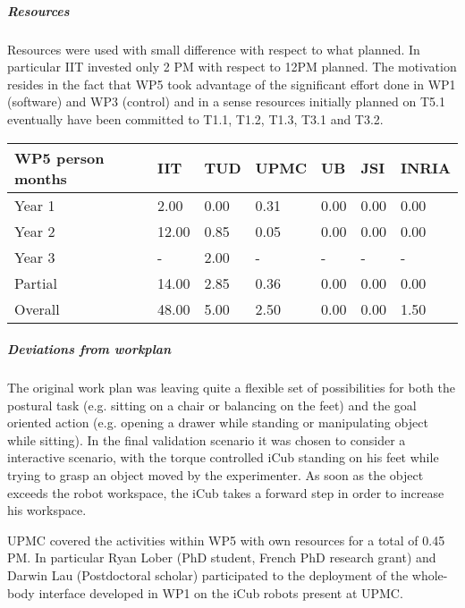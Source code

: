 
\subparagraph{Resources}

Resources were used with small difference with respect to what planned. In particular IIT invested only 2 PM with respect to 12PM planned. The motivation resides in the fact that WP5 took advantage of the significant effort done in WP1 (software) and WP3 (control) and in a sense resources initially planned on T5.1 eventually have been committed to T1.1, T1.2, T1.3, T3.1 and T3.2.

\begin{center}
\begin{tabular}{|C{1.5cm}|C{1.5cm}|C{1.5cm}|C{2cm}|C{2cm}|C{2cm}|C{2cm}|}
\hline
\footnotesize \textbf{WP5 person months}& \footnotesize \textbf{IIT}&\footnotesize \textbf{TUD}&\footnotesize \textbf{UPMC}& \footnotesize \textbf{UB} &\footnotesize \textbf{JSI} & \footnotesize \textbf{INRIA} \\ \hline
\footnotesize Year 1 &  2.00 & 0.00 & 0.31 & 0.00 & 0.00 & 0.00     \\  \hline
\footnotesize Year 2 &  12.00 & 0.85 & 0.05 & 0.00 & 0.00 & 0.00     \\  \hline
\footnotesize Year 3 &  -     & 2.00    & - & -    & - & -     \\  \hline
\footnotesize Partial &  14.00 & 2.85 & 0.36 & 0.00 & 0.00 & 0.00 \\ \hline \hline
\footnotesize Overall &  48.00 & 5.00 & 2.50 & 0.00 & 0.00 & 1.50 \\ \hline
\end{tabular}
\end{center}

\subparagraph{Deviations from workplan} 
The original work plan was leaving quite a flexible set of possibilities for both the postural task (e.g. sitting on a chair or balancing on the feet) and the goal oriented action (e.g. opening a drawer while standing or manipulating object while sitting). In the final validation scenario it was chosen to consider a interactive scenario, with the torque controlled iCub standing on his feet while trying to grasp an object moved by the experimenter. As soon as the object exceeds the robot workspace, the iCub takes a forward step in order to increase his workspace. 

UPMC covered the activities within WP5 with own resources for a total of 0.45 PM. In particular Ryan Lober (PhD student, French PhD research grant) and Darwin Lau (Postdoctoral scholar) participated to the deployment of the whole-body interface developed in WP1 on the iCub robots present at UPMC.
